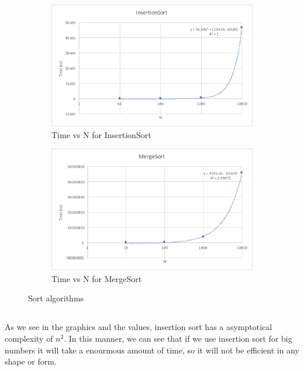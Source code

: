 \documentclass[a4paper,12pt]{article}
\begin{document}
    \begin{figure}[ht]
        \begin{subfigure}[t]{0.444\textwidth}
            \centering
            \includegraphics[width=\textwidth]{InsertionSort.pdf}
            \caption{Time vs N for InsertionSort}
        \end{subfigure}
        \begin{subfigure}[t]{0.444\textwidth}
            \centering
            \includegraphics[width=\textwidth]{MergeSort.pdf}
            \caption{Time vs N for MergeSort}
        \end{subfigure}
        \caption{Sort algorithms}
    \end{figure}

    \subsection{}
    As we see in the graphics and the values, insertion sort has a asymptotical
complexity of $n^2$. In this manner, we can see that if we use insertion sort for
big numbers it will take a enourmous amount of time, so it will not be
efficient in any shape or form.
\end{document}
